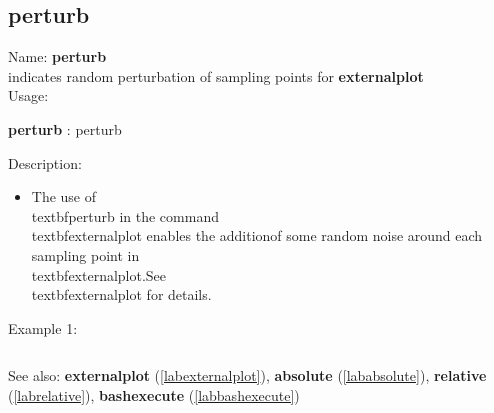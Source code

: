 \subsection{perturb}
\label{labperturb}
\noindent Name: \textbf{perturb}\\
indicates random perturbation of sampling points for \textbf{externalplot}\\
\noindent Usage: 
\begin{center}
\textbf{perturb} : \textsf{perturb}\\
\end{center}
\noindent Description: \begin{itemize}

\item The use of \\textbf{perturb} in the command \\textbf{externalplot} enables the addition\n   of some random noise around each sampling point in \\textbf{externalplot}.\n    \n   See \\textbf{externalplot} for details.\n\end{itemize}
\noindent Example 1: 
\begin{center}\begin{minipage}{15cm}\begin{Verbatim}[frame=single]
\end{Verbatim}
\end{minipage}\end{center}
See also: \textbf{externalplot} (\ref{labexternalplot}), \textbf{absolute} (\ref{lababsolute}), \textbf{relative} (\ref{labrelative}), \textbf{bashexecute} (\ref{labbashexecute})

